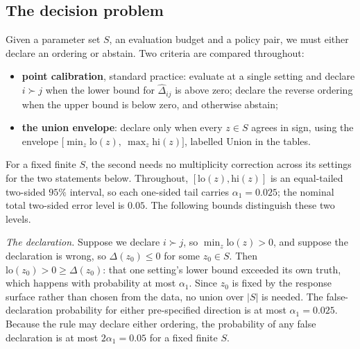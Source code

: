 \documentclass[pdflatex,iicol,sn-apa]{sn-jnl}
\theoremstyle{remark}
\begin{document}
\subsection{The decision problem}\label{subsec3_3}

Given a parameter set $S$, an evaluation budget and a policy pair, we must either declare an ordering
or abstain. Two criteria are compared throughout:
\begin{itemize}
\item \textbf{point calibration}, standard practice: evaluate at a single setting and declare
$i \succ j$ when the lower bound for $\hat\Delta_{ij}$ is above zero; declare the reverse ordering
when the upper bound is below zero, and otherwise abstain;
\item \textbf{the union envelope}: declare only when every $z \in S$ agrees in sign, using the
envelope $\big[\min_{z} \mathrm{lo}(z),\ \max_{z} \mathrm{hi}(z)\big]$, labelled Union in the tables.
\end{itemize}

\noindent For a fixed finite $S$, the second needs no multiplicity correction across its settings
for the two statements below. Throughout,
$[\mathrm{lo}(z), \mathrm{hi}(z)]$ is an equal-tailed two-sided $95\%$ interval, so each
one-sided tail carries $\alpha_1 = 0.025$; the nominal total two-sided error level is $0.05$. The following bounds distinguish these two levels.

\emph{The declaration.} Suppose we declare $i \succ j$, so $\min_z \mathrm{lo}(z) > 0$, and suppose
the declaration is wrong, so $\Delta(z_0) \le 0$ for some $z_0 \in S$. Then
$\mathrm{lo}(z_0) > 0 \ge \Delta(z_0)$: that one setting's lower bound exceeded its own truth, which
happens with probability at most $\alpha_1$. Since $z_0$ is fixed by the response surface rather
than chosen from the data, no union over $|S|$ is needed. The false-declaration probability for either
pre-specified direction is at most $\alpha_1 = 0.025$. Because the rule may declare either ordering,
the probability of any false declaration is at most $2\alpha_1 = 0.05$ for a fixed finite $S$.
\end{document}
